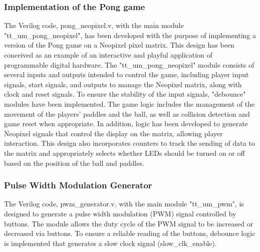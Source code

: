 \subsubsection{Implementation of the Pong game}
The Verilog code, pong\_neopixel.v, with the main module "tt\_um\_pong\_neopixel", has been 
developed with the purpose of implementing a version of the Pong game on a Neopixel pixel 
matrix. This design has been conceived as an example of an interactive and playful application 
of programmable digital hardware. The "tt\_um\_pong\_neopixel" module consists of several 
inputs and outputs intended to control the game, including player input signals, start 
signals, and outputs to manage the Neopixel matrix, along with clock and reset signals. To 
ensure the stability of the input signals, "debounce" modules have been implemented. The game 
logic includes the management of the movement of the players' paddles and the ball, as well as 
collision detection and game reset when appropriate. In addition, logic has been developed to 
generate Neopixel signals that control the display on the matrix, allowing player interaction. 
This design also incorporates counters to track the sending of data to the matrix and 
appropriately selects whether LEDs should be turned on or off based on the position of the 
ball and paddles.\\

\subsubsection{Pulse Width Modulation Generator}
The Verilog code, pwm\_generator.v, with the main module "tt\_um\_pwm", is designed to 
generate a pulse width modulation (PWM) signal controlled by buttons. The module allows the duty cycle of the PWM signal to be increased or 
decreased via buttons. To ensure a reliable reading of the buttons, debounce logic is implemented that 
generates a slow clock signal (slow\_clk\_enable).\\